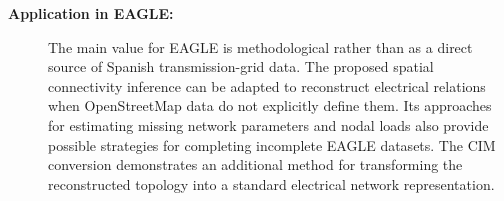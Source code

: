 \begin{description}
    \item[\textbf{Application in EAGLE:}]
    The main value for EAGLE is methodological rather than as a direct source
    of Spanish transmission-grid data. The proposed spatial connectivity
    inference can be adapted to reconstruct electrical relations when
    OpenStreetMap data do not explicitly define them. Its approaches for
    estimating missing network parameters and nodal loads also provide
    possible strategies for completing incomplete EAGLE datasets. The CIM
    conversion demonstrates an additional method for transforming the
    reconstructed topology into a standard electrical network representation.

\end{description}
